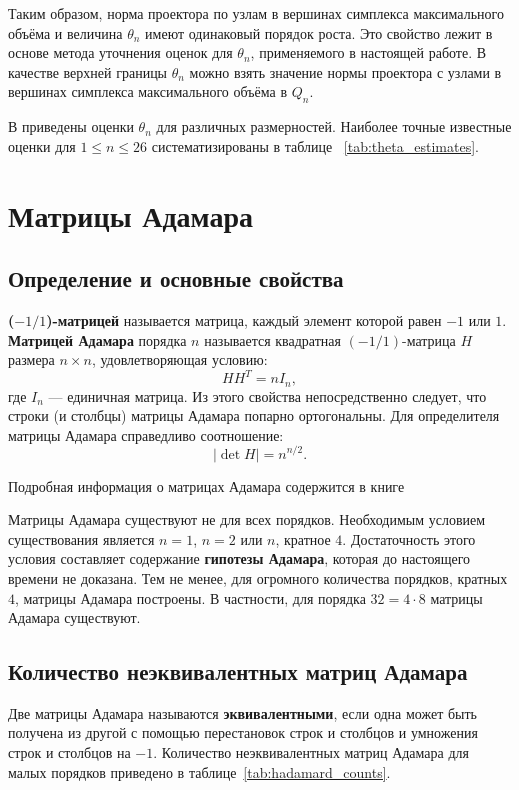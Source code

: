 \documentclass[main]{subfiles}
\begin{document}
Таким образом, норма проектора по узлам в вершинах симплекса максимального объёма и величина $\theta_n$ имеют одинаковый порядок роста. Это свойство лежит в основе метода уточнения оценок для $\theta_n$, применяемого в настоящей работе. В качестве верхней границы $\theta_n$ можно взять значение нормы проектора с узлами в вершинах симплекса максимального объёма в $Q_n$.
\par
В \cite{nevsky_ukhalov_sel_problems} приведены оценки $\theta_n$ для различных размерностей. Наиболее точные известные оценки для $1 \le n \le 26$ систематизированы в таблице ~\ref{tab:theta_estimates}.
\section{Матрицы Адамара}

\subsection{Определение и основные свойства}

\textbf{($-1/1$)-матрицей} называется матрица, каждый элемент которой равен $-1$ или $1$. \textbf{Матрицей Адамара} порядка $n$ называется квадратная $(-1/1)$-матрица $H$ размера $n \times n$, удовлетворяющая условию:
\[
H H^T = n I_n,
\]
где $I_n$ — единичная матрица. Из этого свойства непосредственно следует, что строки (и столбцы) матрицы Адамара попарно ортогональны. Для определителя матрицы Адамара справедливо соотношение:
\[
|\det H| = n^{n/2}.
\]

Подробная информация о матрицах Адамара содержится в книге \cite{hall_comb_1970}

Матрицы Адамара существуют не для всех порядков. Необходимым условием существования является $n = 1$, $n = 2$ или $n$, кратное $4$. Достаточность этого условия составляет содержание \textbf{гипотезы Адамара}, которая до настоящего времени не доказана. Тем не менее, для огромного количества порядков, кратных $4$, матрицы Адамара построены. В частности, для порядка $32 = 4 \cdot 8$ матрицы Адамара существуют.

\subsection{Количество неэквивалентных матриц Адамара}

Две матрицы Адамара называются \textbf{эквивалентными}, если одна может быть получена из другой с помощью перестановок строк и столбцов и умножения строк и столбцов на $-1$. Количество неэквивалентных матриц Адамара для малых порядков приведено в таблице~\ref{tab:hadamard_counts}.
\end{document}
